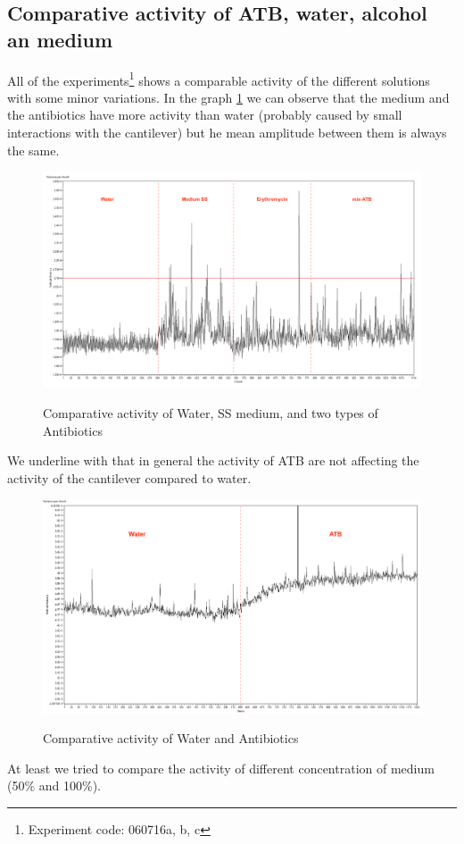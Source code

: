 \documentclass[11pt, a4paper]{article}
\begin{document}
\subsection{Comparative activity of ATB, water, alcohol an medium}
All of the experiments\footnote{Experiment code: 060716a, b, c} shows a comparable activity of the different solutions with some minor variations. In the graph \ref{fig:water_med_atb} we can observe that the medium and the antibiotics have  more activity than water (probably caused by small interactions with the cantilever) but he mean amplitude between them is always the same.

\begin{figure}[h]
\centering
\includegraphics[width=1\linewidth]{Signal/Water_medium_atb.png}
\label{fig:water_med_atb}
\caption{Comparative activity of Water, SS medium, and two types of Antibiotics}
\end{figure}

We underline with that in general the activity of ATB are not affecting the activity of the cantilever compared to water. 
\begin{figure}[h]
\centering
\includegraphics[width=1\linewidth]{Signal/Water__ATB2.jpg}
\label{fig:water_ATB}
\caption{Comparative activity of Water and Antibiotics}
\end{figure}
At least we tried to compare the activity of different concentration of medium (50\% and 100\%). 
\end{document}
